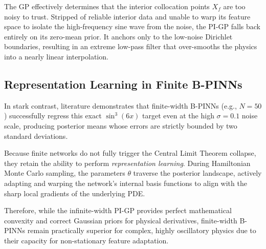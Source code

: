 \documentclass[11pt]{article}
\begin{document}
The GP effectively determines that the interior collocation points $X_f$ are too noisy to trust. Stripped of reliable interior data and unable to warp its feature space to isolate the high-frequency sine wave from the noise, the PI-GP falls back entirely on its zero-mean prior. It anchors only to the low-noise Dirichlet boundaries, resulting in an extreme low-pass filter that over-smooths the physics into a nearly linear interpolation.

\subsection{Representation Learning in Finite B-PINNs}
In stark contrast, literature demonstrates that finite-width B-PINNs (e.g., $N=50$) successfully regress this exact $\sin^3(6x)$ target even at the high $\sigma = 0.1$ noise scale, producing posterior means whose errors are strictly bounded by two standard deviations. 

Because finite networks do not fully trigger the Central Limit Theorem collapse, they retain the ability to perform \emph{representation learning}. During Hamiltonian Monte Carlo sampling, the parameters $\theta$ traverse the posterior landscape, actively adapting and warping the network's internal basis functions to align with the sharp local gradients of the underlying PDE. 

Therefore, while the infinite-width PI-GP provides perfect mathematical convexity and correct Gaussian priors for physical derivatives, finite-width B-PINNs remain practically superior for complex, highly oscillatory physics due to their capacity for non-stationary feature adaptation.
\end{document}
